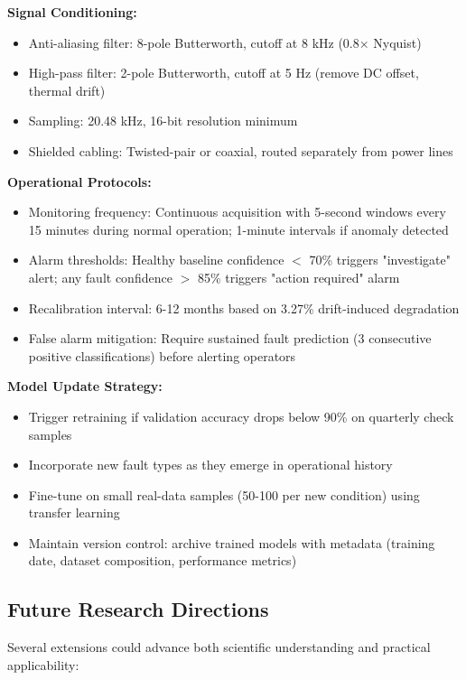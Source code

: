 \documentclass[11pt,a4paper]{article}
\begin{document}
\textbf{Signal Conditioning:}
\begin{itemize}[itemsep=0.2em]
    \item Anti-aliasing filter: 8-pole Butterworth, cutoff at 8 kHz (0.8× Nyquist)
    \item High-pass filter: 2-pole Butterworth, cutoff at 5 Hz (remove DC offset, thermal drift)
    \item Sampling: 20.48 kHz, 16-bit resolution minimum
    \item Shielded cabling: Twisted-pair or coaxial, routed separately from power lines
\end{itemize}

\textbf{Operational Protocols:}
\begin{itemize}[itemsep=0.2em]
    \item Monitoring frequency: Continuous acquisition with 5-second windows every 15 minutes during normal operation; 1-minute intervals if anomaly detected
    \item Alarm thresholds: Healthy baseline confidence  $<$ 70\% triggers "investigate" alert; any fault confidence  $>$ 85\% triggers "action required" alarm
    \item Recalibration interval: 6-12 months based on 3.27\% drift-induced degradation
    \item False alarm mitigation: Require sustained fault prediction (3 consecutive positive classifications) before alerting operators
\end{itemize}

\textbf{Model Update Strategy:}
\begin{itemize}[itemsep=0.2em]
    \item Trigger retraining if validation accuracy drops below 90\% on quarterly check samples
    \item Incorporate new fault types as they emerge in operational history
    \item Fine-tune on small real-data samples (50-100 per new condition) using transfer learning
    \item Maintain version control: archive trained models with metadata (training date, dataset composition, performance metrics)
\end{itemize}

\subsection{Future Research Directions}

Several extensions could advance both scientific understanding and practical applicability:
\end{document}
